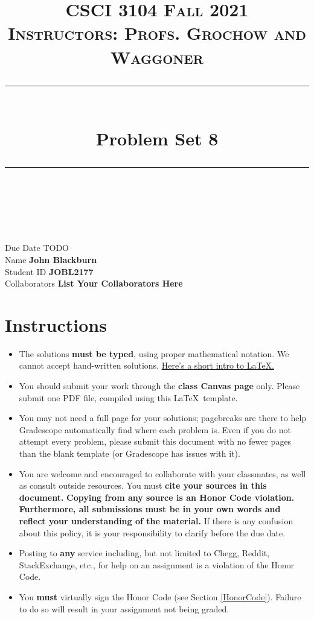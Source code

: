 \documentclass[11pt]{article}
\title{
\normalfont \normalsize 
\textsc{CSCI 3104 Fall 2021 \\ 
Instructors: Profs. Grochow and Waggoner} \\
[10pt] 
\rule{\linewidth}{0.5pt} \\[6pt] 
\huge Problem Set 8\\
\rule{\linewidth}{2pt}  \\[10pt]
}
\date{}
\theoremstyle{definition}
\theoremstyle{definition}
\theoremstyle{definition}
\begin{document}
\maketitle


\noindent
Due Date \dotfill TODO \\
Name \dotfill \textbf{John Blackburn} \\
Student ID \dotfill \textbf{JOBL2177} \\
Collaborators \dotfill \textbf{List Your Collaborators Here}

\tableofcontents

\section{Instructions}
 \begin{itemize}
	\item The solutions \textbf{must be typed}, using proper mathematical notation. We cannot accept hand-written solutions. \href{http://ece.uprm.edu/~caceros/latex/introduction.pdf}{Here's a short intro to \LaTeX.}
	\item You should submit your work through the \textbf{class Canvas page} only. Please submit one PDF file, compiled using this \LaTeX \ template.
	\item You may not need a full page for your solutions; pagebreaks are there to help Gradescope automatically find where each problem is. Even if you do not attempt every problem, please submit this document with no fewer pages than the blank template (or Gradescope has issues with it).

	\item You are welcome and encouraged to collaborate with your classmates, as well as consult outside resources. You must \textbf{cite your sources in this document.} \textbf{Copying from any source is an Honor Code violation. Furthermore, all submissions must be in your own words and reflect your understanding of the material.} If there is any confusion about this policy, it is your responsibility to clarify before the due date. 

	\item Posting to \textbf{any} service including, but not limited to Chegg, Reddit, StackExchange, etc., for help on an assignment is a violation of the Honor Code.

	\item You \textbf{must} virtually sign the Honor Code (see Section \ref{HonorCode}). Failure to do so will result in your assignment not being graded.
\end{itemize}
\end{document}
